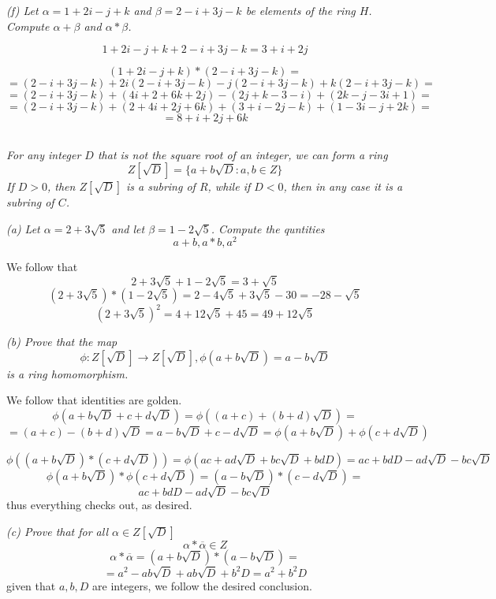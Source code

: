 \documentclass[11pt,oneside,titlepage]{book}
\newcommand{\set}[1]{\{ #1 \}}
\begin{document}
\textit{(f) Let $\alpha = 1 + 2i - j + k$ and $\beta = 2 - i + 3j - k$ be
  elements of the ring $H$. Compute $\alpha + \beta$ and $\alpha *
  \beta$.}

$$1 + 2i - j + k +  2 - i + 3j - k = 3 + i + 2j$$

$$(1 + 2i - j + k) *  (2 - i + 3j - k) = $$
$$ = (2 - i + 3j - k) + 2i(2 - i + 3j - k) - j(2 - i + 3j - k) + k(2 - i + 3j - k) = $$
$$ = (2 - i + 3j - k) + (4i + 2 + 6k + 2j) - (2j + k - 3 - i) + (2k - j - 3i + 1) = $$
$$ = (2 - i + 3j - k) + (2 + 4i + 2j +  6k) + (3 + i - 2j - k) + (1 - 3i - j + 2k) = $$
$$ = 8 + i + 2j + 6k $$

\subsection{}

\textit{For any integer $D$ that is not the square root of an integer,
we can form a ring
  $$Z[\sqrt{D}] = \set{a + b\sqrt{D}: a, b \in Z}$$
  If $D > 0$, then $Z[\sqrt{D}]$ is a subring of $R$, while if $D < 0$,
  then in any case it is a subring of $C$.}

\textit{(a) Let $\alpha = 2 + 3 \sqrt{5}$ and let $\beta = 1 - 2\sqrt{5}$. Compute
  the quntities
  $$a + b, a * b, a^2$$}

We follow that
$$2 + 3 \sqrt{5} + 1 - 2 \sqrt{5} = 3 + \sqrt{5}$$
$$(2 + 3 \sqrt{5}) * (1 - 2 \sqrt{5}) = 2 - 4\sqrt{5} + 3 \sqrt{5} - 30 = -28 - \sqrt{5}$$
$$(2 + 3 \sqrt{5})^2 = 4 + 12 \sqrt{5} + 45 = 49 + 12 \sqrt{5}$$

\textit{(b) Prove that the map
  $$\phi: Z[\sqrt{D}] \to Z[\sqrt{D}], \phi(a + b\sqrt{D}) = a - b \sqrt{D}$$
  is a ring homomorphism. }

We follow that identities are golden.
$$\phi(a + b\sqrt{D} + c + d\sqrt{D}) =  \phi((a + c) + (b + d)\sqrt{D}) = $$
$$ = 
(a + c) - (b + d)\sqrt{D} = a - b\sqrt{D} + c - d\sqrt{D} = \phi(a + b\sqrt{D}) + \phi(c + d\sqrt{D})$$

$$\phi((a + b\sqrt{D}) * (c + d\sqrt{D})) = \phi(ac + ad\sqrt{D} + bc\sqrt{D} + bdD) =
ac + bdD - ad\sqrt{D} - bc\sqrt{D}$$
$$\phi(a + b\sqrt{D}) * \phi(c + d\sqrt{D}) = (a - b\sqrt{D}) * (c - d \sqrt{D}) = $$
$$ ac  + bdD  - ad\sqrt{D} - bc\sqrt{D}$$
thus everything checks out, as desired.

\textit{(c) Prove that for all $\alpha \in Z[\sqrt{D}]$
  $$\alpha *  \overline{\alpha} \in Z$$}
$$\alpha *  \overline{\alpha} = (a + b\sqrt{D}) * (a - b\sqrt{D}) = $$
$$ = a^2 - ab\sqrt{D} + ab\sqrt{D} + b^2D = a^2 + b^2D$$
given that $a, b, D$ are integers, we follow the desired conclusion.
\end{document}
